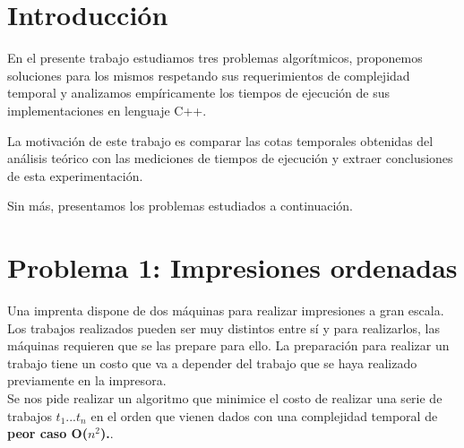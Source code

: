 \documentclass[a4paper, 10pt, twoside]{article}
\begin{document}
\newpage




\tableofcontents

\newpage




\section{Introducción}

En el presente trabajo estudiamos tres problemas algorítmicos, proponemos soluciones para los mismos respetando sus requerimientos de complejidad temporal y analizamos empíricamente los tiempos de ejecución de sus implementaciones en lenguaje C++.

La motivación de este trabajo es comparar las cotas temporales obtenidas del análisis teórico con las mediciones de tiempos de ejecución y extraer conclusiones de esta experimentación.

Sin más, presentamos los problemas estudiados a continuación.



\newpage

\section{Problema 1: Impresiones ordenadas}

Una imprenta dispone de dos máquinas para realizar impresiones a gran escala. Los trabajos realizados pueden ser muy distintos entre sí y para realizarlos, las máquinas requieren que se las prepare para ello. La preparación para realizar un trabajo tiene un costo que va a depender del trabajo que se haya realizado previamente en la impresora.\\

Se nos pide realizar un algoritmo que minimice el costo de realizar una serie de trabajos $t_1$...$t_n$ en el orden que vienen dados con una complejidad temporal de \textbf{peor caso O($n^2$).}.
\end{document}
